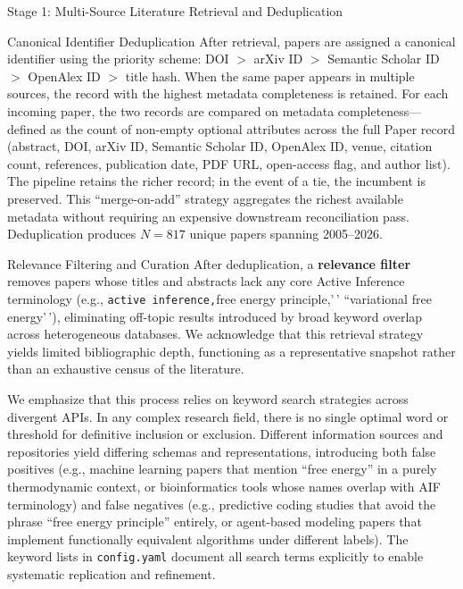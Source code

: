 \documentclass[
  ignorenonframetext,
]{beamer}
\begin{document}
\begin{frame}{Stage 1: Multi-Source Literature
Retrieval and Deduplication \label{sec:methods_retrieval}}
\begin{block}{Canonical Identifier Deduplication}
\protect{}\label{canonical-identifier-deduplication}
After retrieval, papers are assigned a canonical identifier using the
priority scheme: DOI \(>\) arXiv ID \(>\) Semantic Scholar ID \(>\)
OpenAlex ID \(>\) title hash. When the same paper appears in multiple
sources, the record with the highest metadata completeness is retained.
For each incoming paper, the two records are compared on metadata
completeness---defined as the count of non-empty optional attributes
across the full Paper record (abstract, DOI, arXiv ID, Semantic Scholar
ID, OpenAlex ID, venue, citation count, references, publication date,
PDF URL, open-access flag, and author list). The pipeline retains the
richer record; in the event of a tie, the incumbent is preserved. This
``merge-on-add'' strategy aggregates the richest available metadata
without requiring an expensive downstream reconciliation pass.
Deduplication produces \(N = 817\) unique papers spanning 2005--2026.
\end{block}

\begin{block}{Relevance Filtering and Curation}
\protect{}\label{relevance-filtering-and-curation}
After deduplication, a \textbf{relevance filter} removes papers whose
titles and abstracts lack any core Active Inference terminology (e.g.,
\texttt{active\ inference,\textquotesingle{}\textquotesingle{}}free
energy principle,'\,' ``variational free energy'\,'), eliminating
off-topic results introduced by broad keyword overlap across
heterogeneous databases. We acknowledge that this retrieval strategy
yields limited bibliographic depth, functioning as a representative
snapshot rather than an exhaustive census of the literature.

We emphasize that this process relies on keyword search strategies
across divergent APIs. In any complex research field, there is no single
optimal word or threshold for definitive inclusion or exclusion.
Different information sources and repositories yield differing schemas
and representations, introducing both false positives (e.g., machine
learning papers that mention ``free energy'' in a purely thermodynamic
context, or bioinformatics tools whose names overlap with AIF
terminology) and false negatives (e.g., predictive coding studies that
avoid the phrase ``free energy principle'' entirely, or agent-based
modeling papers that implement functionally equivalent algorithms under
different labels). The keyword lists in \texttt{config.yaml} document
all search terms explicitly to enable systematic replication and
refinement.


\end{block}
\end{frame}
\end{document}
